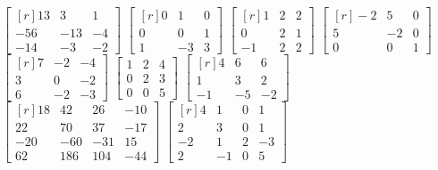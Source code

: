 \begin{tasks}[
    style=enumerate,
    label-offset = 3mm,
    ]
    \task $\begin{bmatrix*}[r]13 & 3 & 1 \\ -56 & -13 & -4 \\ -14 & -3 & -2\end{bmatrix*}$
    \task $\begin{bmatrix*}[r]0 & 1 & 0 \\ 0 & 0 & 1 \\ 1 & -3 & 3\end{bmatrix*}$
    \task $\begin{bmatrix*}[r]1 & 2 & 2 \\ 0 & 2 & 1 \\ -1 & 2 & 2\end{bmatrix*}$
    \task $\begin{bmatrix*}[r]-2 & 5 & 0 \\ 5 & -2 & 0 \\ 0 & 0 & 1\end{bmatrix*}$
    \task $\begin{bmatrix*}[r]7 & -2 & -4 \\ 3 & 0 & -2 \\ 6 & -2 & -3\end{bmatrix*}$
    \task $\begin{bmatrix*}1 & 2 & 4 \\ 0 & 2 & 3 \\ 0 & 0 & 5\end{bmatrix*}$
    \task $\begin{bmatrix*}[r]4 & 6 & 6 \\ 1 & 3 & 2 \\ -1 & -5 & -2\end{bmatrix*}$
    \task $\begin{bmatrix*}[r]18 & 42 & 26 & -10 \\ 22 & 70 & 37 & -17 \\ -20 & -60 & -31 & 15 \\ 62 & 186 & 104 & -44\end{bmatrix*}$
    \task $\begin{bmatrix*}[r]4 & 1 & 0 & 1 \\ 2 & 3 & 0 & 1 \\ -2 & 1 & 2 & -3 \\ 2 & -1 & 0 & 5\end{bmatrix*}$

\end{tasks}
